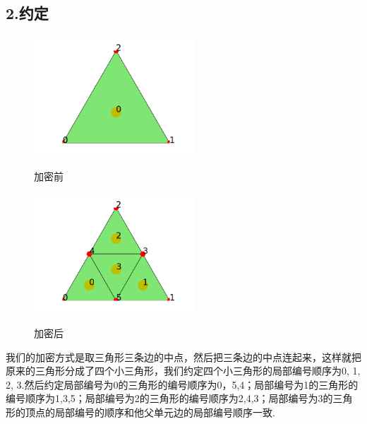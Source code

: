 \documentclass{article}
\begin{document}
\subsection{2.约定}
\begin{figure}[H]
\centering
\begin{minipage}[!htbp]{0.3\linewidth}
    \centerline{\includegraphics[width=6cm]{./figures/Figure_3.png}}
    \centerline{加密前}
\end{minipage}
\hspace{0.25in}		
\begin{minipage}[!htbp]{0.3\linewidth}
    \centerline{\includegraphics[width=6cm]{./figures/Figure_2.png}}
    \centerline{加密后}
\end{minipage}
\end{figure}
我们的加密方式是取三角形三条边的中点，然后把三条边的中点连起来，这样就把原来的三角形分成了四个小三角形，我们约定四个小三角形的局部编号顺序为0, 1, 2, 3.然后约定局部编号为0的三角形的编号顺序为0，5,4；局部编号为1的三角形的编号顺序为1,3,5；局部编号为2的三角形的编号顺序为2,4,3；局部编号为3的三角形的顶点的局部编号的顺序和他父单元边的局部编号顺序一致.
\end{document}
